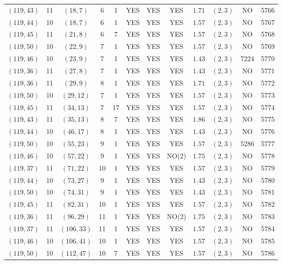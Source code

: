 \begin{longtable}{|c|c|c|c|c|c|c|c|c|c|c|c|}
$(119,43)$ & 11 & $(18,7)$ & 6 & 1 & YES & YES & YES & $1.71$ & $(2,3)$ & NO & 5766\\
$(119,44)$ & 10 & $(18,7)$ & 6 & 1 & YES & YES & YES & $1.57$ & $(2,3)$ & NO & 5767\\
$(119,45)$ & 11 & $(21,8)$ & 6 & 7 & YES & YES & YES & $1.57$ & $(2,3)$ & NO & 5768\\
$(119,50)$ & 10 & $(22,9)$ & 7 & 1 & YES & YES & YES & $1.57$ & $(2,3)$ & NO & 5769\\
$(119,46)$ & 10 & $(23,9)$ & 7 & 1 & YES & YES & YES & $1.43$ & $(2,3)$ & 7224 & 5770\\
$(119,36)$ & 11 & $(27,8)$ & 7 & 1 & YES & YES & YES & $1.43$ & $(2,3)$ & NO & 5771\\
$(119,36)$ & 11 & $(29,9)$ & 8 & 1 & YES & YES & YES & $1.71$ & $(2,3)$ & NO & 5772\\
$(119,50)$ & 10 & $(29,12)$ & 7 & 1 & YES & YES & YES & $1.57$ & $(2,3)$ & NO & 5773\\
$(119,45)$ & 11 & $(34,13)$ & 7 & 17 & YES & YES & YES & $1.57$ & $(2,3)$ & NO & 5774\\
$(119,43)$ & 11 & $(35,13)$ & 8 & 7 & YES & YES & YES & $1.86$ & $(2,3)$ & NO & 5775\\
$(119,44)$ & 10 & $(46,17)$ & 8 & 1 & YES & YES & YES & $1.43$ & $(2,3)$ & NO & 5776\\
$(119,50)$ & 10 & $(55,23)$ & 9 & 1 & YES & YES & YES & $1.57$ & $(2,3)$ & 5286 & 5777\\
$(119,46)$ & 10 & $(57,22)$ & 9 & 1 & YES & YES & NO(2) & $1.75$ & $(2,3)$ & NO & 5778\\
$(119,37)$ & 11 & $(71,22)$ & 10 & 1 & YES & YES & YES & $1.57$ & $(2,3)$ & NO & 5779\\
$(119,44)$ & 10 & $(73,27)$ & 9 & 1 & YES & YES & YES & $1.43$ & $(2,3)$ & NO & 5780\\
$(119,50)$ & 10 & $(74,31)$ & 9 & 1 & YES & YES & YES & $1.43$ & $(2,3)$ & NO & 5781\\
$(119,45)$ & 11 & $(82,31)$ & 10 & 1 & YES & YES & YES & $1.57$ & $(2,3)$ & NO & 5782\\
$(119,36)$ & 11 & $(96,29)$ & 11 & 1 & YES & YES & NO(2) & $1.75$ & $(2,3)$ & NO & 5783\\
$(119,37)$ & 11 & $(106,33)$ & 11 & 1 & YES & YES & YES & $1.57$ & $(2,3)$ & NO & 5784\\
$(119,46)$ & 10 & $(106,41)$ & 10 & 1 & YES & YES & YES & $1.57$ & $(2,3)$ & NO & 5785\\
$(119,50)$ & 10 & $(112,47)$ & 10 & 7 & YES & YES & YES & $1.57$ & $(2,3)$ & NO & 5786\\

\end{longtable}
